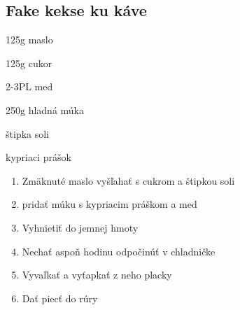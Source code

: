 \setcounter{step}{0}
\subsection{Fake kekse ku káve}

\begin{ingredient}
\def\portions{4}%

\begin{main}
	\item 125g maslo
	\item 125g cukor
	\item 2-3PL med
	\item 250g hladná múka
	\item štipka soli
	\item kypriaci prášok
\end{main}
\end{ingredient}
\begin{recipe}

\begin{enumerate}


\item{Zmäknuté maslo vyšľahať s cukrom a štipkou soli}
\item{pridať múku s kypriacim práškom a med}
\item{Vyhnietiť do jemnej hmoty}	
\item{Nechať aspoň hodinu odpočinúť v chladničke}
\item{Vyvaľkať a vyťapkať z neho placky}
\item{Dať piecť do rúry}

\end{enumerate}
\end{recipe}

\begin{notes}

\end{notes}
\clearpage	